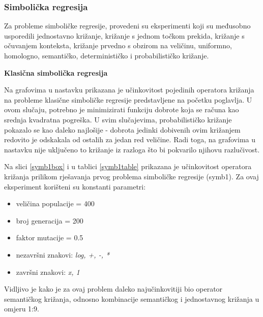 \subsubsection{Simbolička regresija}

Za probleme simboličke regresije, provedeni su eksperimenti koji su međusobno usporedili jednostavno križanje, križanje s jednom točkom prekida, križanje s očuvanjem konteksta, križanje prvedno s obzirom na veličinu, uniformno, homologno, semantičko, determinističko i probabilističko križanje.

\textbf{Klasična simbolička regresija}


Na grafovima u nastavku prikazana je učinkovitost pojedinih operatora križanja na probleme klasične simboličke regresije predstavljene na početku poglavlja. U ovom slučaju, potrebno je minimizirati funkciju dobrote koja se računa kao srednja kvadratna pogreška. U svim slučajevima, probabilističko križanje pokazalo se kao daleko najlošije - dobrota jedinki dobivenih ovim križanjem redovito je odskakala od ostalih za jedan red veličine. Radi toga, na grafovima u nastavku nije uključeno to križanje iz razloga što bi pokvarilo njihovu razlučivost.

Na slici \ref{symb1box} i u tablici \ref{symb1table} prikazana je učinkovitost operatora križanja prilikom rješavanja prvog problema simboličke regresije (symb1). Za ovaj eksperiment korišteni su konstanti parametri:
\begin{itemize}
\item{veličina populacije = 400}
\item{broj generacija = 200}
\item{faktor mutacije = 0.5}
\item{nezavršni znakovi: \textit{log, +, -, *}}
\item{završni znakovi: \textit{x, 1}}
\end{itemize}

Vidljivo je kako je za ovaj problem daleko najučinkovitiji bio operator semantičkog križanja, odnosno kombinacije semantičkog i jednostavnog križanja u omjeru 1:9. 


